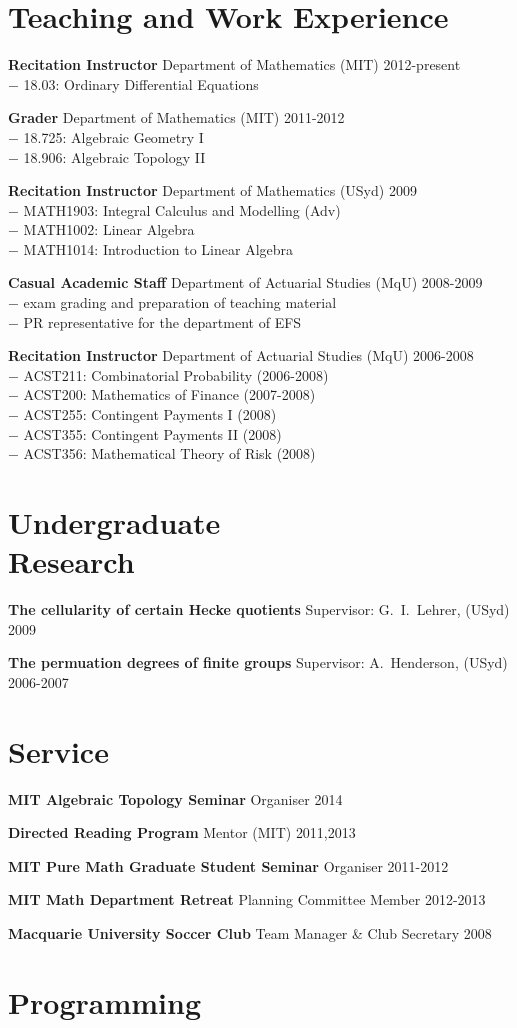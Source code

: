 \documentclass[margin,line]{resume}
\newcommand{\CVsection}[1]{\section{\mysidestyle #1}}
\newcommand{\entry}[3]{\textbf{#1} #2 \hfill {#3}
           
\vspace{-2.7mm}}
\newcommand{\twolineentry}[4]{\textbf{#1} #2 \hfill {#4}\\%
#3
           
\vspace{-2.7mm}}
\newcommand{\FINALentry}[3]{\textbf{#1} #2 \hfill {#3}}
\newcommand{\FINALtwolineentry}[4]{\textbf{#1} #2 \hfill {#4}\\%
#3}
\begin{document}
\begin{resume}
\CVsection{Teaching and Work Experience}

\twolineentry{Recitation Instructor}{Department of Mathematics (MIT)}{\phantom{space}$-$ 18.03: Ordinary Differential Equations}{2012-present}
\twolineentry{Grader}{Department of Mathematics (MIT)}{%
\phantom{space}$-$ 18.725: Algebraic Geometry I\\
\phantom{space}$-$ 18.906: Algebraic Topology II%
}{2011-2012}
\twolineentry{Recitation Instructor}{Department of Mathematics (USyd)}{%
\phantom{space}$-$ MATH1903: Integral Calculus and Modelling (Adv)\\
\phantom{space}$-$ MATH1002: Linear Algebra\\
\phantom{space}$-$ MATH1014: Introduction to Linear Algebra%
}{2009}
\twolineentry{Casual Academic Staff}{Department of Actuarial Studies (MqU)}{%
\phantom{space}$-$ exam grading and preparation of teaching material\\
\phantom{space}$-$ PR representative for the department of EFS%
}{2008-2009}
\FINALtwolineentry{Recitation Instructor}{Department of Actuarial Studies (MqU)}{%
\phantom{space}$-$ ACST211: Combinatorial Probability (2006-2008)\\
\phantom{space}$-$ ACST200: Mathematics of Finance (2007-2008)\\
\phantom{space}$-$ ACST255: Contingent Payments I (2008)\\
\phantom{space}$-$ ACST355: Contingent Payments II (2008)\\
\phantom{space}$-$ ACST356: Mathematical Theory of Risk (2008)%
}{2006-2008}


\CVsection{Undergraduate \\ Research}

\entry{The cellularity of certain Hecke quotients}{Supervisor: G.\ I.\ Lehrer, (USyd)}{2009}
\FINALentry{The permuation degrees of finite groups}{Supervisor: A.\ Henderson, (USyd)}{2006-2007}


\CVsection{Service}

\entry{MIT Algebraic Topology Seminar}{Organiser}{2014}
\entry{Directed Reading Program}{Mentor (MIT)}{2011,2013}
\entry{MIT Pure Math Graduate Student Seminar}{Organiser}{2011-2012}
\entry{MIT Math Department Retreat}{Planning Committee Member}{2012-2013}
\FINALentry{Macquarie University Soccer Club}{Team Manager \& Club Secretary}{2008}


\CVsection{Programming}


\end{resume}
\end{document}
